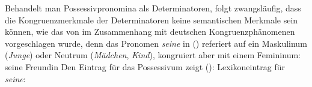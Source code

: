 Behandelt man Possessivpronomina als Determinatoren, folgt zwangsläufig, dass die Kongruenzmerkmale
der Determinatoren keine semantischen Merkmale sein können, wie das \zb von \citet[]{ps2}
im Zusammenhang mit deutschen Kongruenzphänomenen vorgeschlagen wurde, 
denn das Pronomen \emph{seine} in () referiert auf ein Maskulinum (\emph{Junge}) oder Neutrum
(\emph{Mädchen}, \emph{Kind}), kongruiert aber mit einem Femininum:
\ea
seine Freundin
\z
Den Eintrag für das Possessivum zeigt ():
\eas
\label{le-seine-agr}%
Lexikoneintrag für \emph{seine}:\\
\zs
{}%

